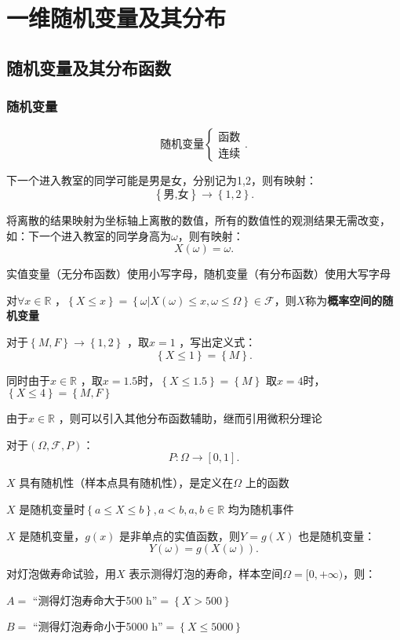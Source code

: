 \section{一维随机变量及其分布}%
\label{sec:一维随机变量及其分布}
\subsection{随机变量及其分布函数}%
\label{sub:随机变量及其分布函数}
\subsubsection*{随机变量}%
\label{subsub:随机变量}
\[
    \text{随机变量}
    \begin{cases}
        \text{函数}\\ 
        \text{连续}
    \end{cases}
.\] 
\begin{eg}
    下一个进入教室的同学可能是男是女，分别记为1,2，则有映射：
    \[
        \left\{ \text{男,女} \right\} \to \left\{ 1,2 \right\} 
    .\] 

    将离散的结果映射为坐标轴上离散的数值，所有的数值性的观测结果无需改变，如：下一个进入教室的同学身高为$\omega$，则有映射：
    \[
        X\left( \omega \right) =\omega
    .\] 
\end{eg}
\begin{defi}
    实值变量（无分布函数）使用小写字母，随机变量（有分布函数）使用大写字母

    对$\forall x\in \mathbb{R}$ ，$\left\{ X\le x \right\} =\left\{ \omega|X\left( \omega \right) \le x,\omega\le \Omega \right\}\in \mathscr{F} $，则$X$称为\textbf{概率空间的随机变量}
\end{defi}
\begin{eg}
    对于$\left\{ M,F \right\} \to \left\{ 1,2 \right\} $ ，取$x=1$ ，写出定义式：\[
        \left\{ X\le 1 \right\} =\left\{ M \right\} 
    .\] 

    同时由于$x\in \mathbb{R}$ ，取$x=1.5$时，$\left\{ X\le 1.5 \right\} =\left\{ M \right\} $
    取$x=4$时，$\left\{ X\le 4 \right\} =\left\{ M,F \right\} $
\end{eg}
由于$x\in \mathbb{R}$ ，则可以引入其他分布函数辅助，继而引用微积分理论

对于$\left( \Omega,\mathscr{F},P \right) $：\[
    P: \Omega\to \left[ 0,1 \right] 
.\] 
\begin{notation}
    $X$ 具有随机性（样本点具有随机性），是定义在$\Omega$ 上的函数

    $X$ 是随机变量时$\left\{ a\le X\le b \right\} ,a<b,a,b\in \mathbb{R}$ 均为随机事件

    $X$ 是随机变量，$g\left( x \right) $ 是非单点的实值函数，则$Y=g\left( X \right) $ 也是随机变量：\[
        Y\left( \omega \right) =g\left( X\left( \omega \right)  \right) 
    .\] 
\end{notation}
\begin{eg}
    对灯泡做寿命试验，用$X$ 表示测得灯泡的寿命，样本空间$\Omega=[0,+\infty)$，则：

    $A=$ “测得灯泡寿命大于500 h”$=\left\{ X>500 \right\} $

    $B=$ “测得灯泡寿命小于5000 h”$=\left\{ X\le 5000 \right\} $
\end{eg}
